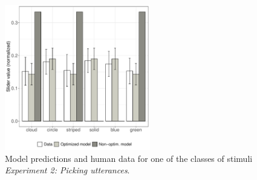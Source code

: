 \documentclass[10pt,a4paper]{article}
\newcommand{\gcs}[1]{\textcolor{blue}{[gcs: #1]}}
\begin{document}
\begin{figure}[ht!]
	\centering
	\includegraphics[width=2.5in]{images/barplot_x3.pdf}
	\caption{Model predictions and human data for one of the classes of stimuli \emph{Experiment 2: Picking utterances}.}\label{barplot_x3}
\end{figure}

\end{document}
